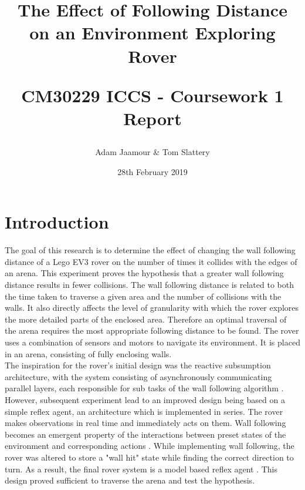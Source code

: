 \documentclass[a4paper,12pt,twocolumn]{article}
\title{
    The Effect of Following Distance on an Environment Exploring Rover\\
    \begin{large}
        CM30229 ICCS - Coursework 1 Report
    \end{large}
}
\author{Adam Jaamour & Tom Slattery}
\date{28th February 2019}
\begin{document}
\maketitle
\thispagestyle{empty}
\clearpage
\setcounter{page}{1}


\section{Introduction}

The goal of this research is to determine the effect of changing the wall following distance of a Lego EV3 rover on the number of times it collides with the edges of an arena. This experiment proves the hypothesis that a greater wall following distance results in fewer collisions. The wall following distance is related to both the time taken to traverse a given area and the number of collisions with the walls. It also directly affects the level of granularity with which the rover explores the more detailed parts of the enclosed area. Therefore an optimal traversal of the arena requires the most appropriate following distance to be found. The rover uses a combination of sensors and motors to navigate its environment. It is placed in an arena, consisting of fully enclosing walls.\\

The inspiration for the rover's initial design was the reactive subsumption architecture, with the system consisting of asynchronously communicating parallel layers, each responsible for sub tasks of the wall following algorithm \cite{brooks1991intelligence}. However, subsequent experiment lead to an improved design being based on a simple reflex agent, an architecture which is implemented in series. The rover makes observations in real time and immediately acts on them. Wall following becomes an emergent property of the interactions between preset states of the environment and corresponding actions \cite{wooldridge2009introduction}. While implementing wall following, the rover was altered to store a "wall hit" state while finding the correct direction to turn. As a result, the final rover system is a model based reflex agent \cite{russell1995artificial}. This design proved sufficient to traverse the arena and test the hypothesis.
\end{document}
